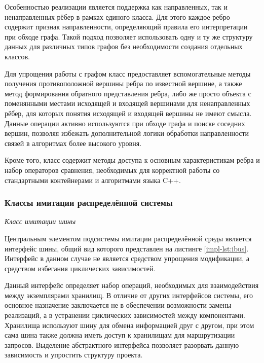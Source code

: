 Особенностью реализации является поддержка как направленных, так и ненаправленных рёбер в рамках единого класса. Для этого каждое ребро содержит признак направленности, определяющий правила его интерпретации при обходе графа. Такой подход позволяет использовать одну и ту же структуру данных для различных типов графов без необходимости создания отдельных классов.

Для упрощения работы с графом класс предоставляет вспомогательные методы получения противоположной вершины ребра по известной вершине, а также метод формирования обратного представления ребра, либо же просто объекта с поменянными местами исходящей и входящей вершинами для ненаправленных рёбер, для которых понятия исходящей и входящей вершины не имеют смысла. Данные операции активно используются при обходе графа и поиске соседних вершин, позволяя избежать дополнительной логики обработки направленности связей в алгоритмах более высокого уровня.

Кроме того, класс содержит методы доступа к основным характеристикам ребра и набор операторов сравнения, необходимых для корректной работы со стандартными контейнерами и алгоритмами языка C++.

\subsubsection{Классы имитации распределённой системы}

\textit{Класс имитации шины}

Центральным элементом подсистемы имитации распределённой среды является интерфейс шины, общий вид которого представлен на листинге \ref{impl-lst:ibus}. Интерфейс в данном случае не является средством упрощения модификации, а средством избегания циклических зависимостей.

Данный интерфейс определяет набор операций, необходимых для взаимодействия между экземплярами хранилищ. В отличие от других интерфейсов системы, его основное назначение заключается не в обеспечении возможности замены реализаций, а в устранении циклических зависимостей между компонентами. Хранилища используют шину для обмена информацией друг с другом, при этом сама шина также должна иметь доступ к хранилищам для маршрутизации запросов. Выделение абстрактного интерфейса позволяет разорвать данную зависимость и упростить структуру проекта.

